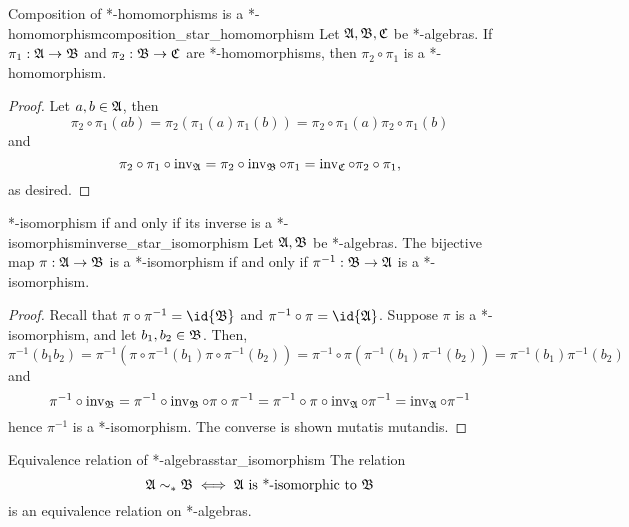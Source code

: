 \begin{lemma}{Composition of *-homomorphisms is a *-homomorphism}{composition_star_homomorphism}
    Let \(\mathfrak{A}, \mathfrak{B}, \mathfrak{C}\) be *-algebras. If \(\pi_1 : \mathfrak{A} \to \mathfrak{B}\) and \(\pi_2 : \mathfrak{B} \to \mathfrak{C}\) are *-homomorphisms, then \(\pi_2 \circ \pi_1\) is a *-homomorphism.
\end{lemma}
\begin{proof}
    Let \(a, b \in \mathfrak{A}\), then
    \begin{equation*}
        \pi_2\circ \pi_1(ab) = \pi_2(\pi_1(a) \pi_1(b)) = \pi_2\circ \pi_1(a) \pi_2\circ\pi_1(b)
    \end{equation*}
    and
    \begin{equation*}
        \pi_2\circ \pi_1 \circ \operatorname{inv}_{\mathfrak{A}} = \pi_2 \circ \operatorname{inv}_{\mathfrak{B}} \circ \pi_1 = \operatorname{inv}_{\mathfrak{C}} \circ \pi_2 \circ \pi_1,
    \end{equation*}
    as desired.
\end{proof}
\begin{lemma}{*-isomorphism if and only if its inverse is a *-isomorphism}{inverse_star_isomorphism}
    Let \(\mathfrak{A}, \mathfrak{B}\) be *-algebras. The bijective map \(\pi : \mathfrak{A} \to \mathfrak{B}\) is a *-isomorphism if and only if \(\pi^{-1} : \mathfrak{B} \to \mathfrak{A}\) is a *-isomorphism.
\end{lemma}
\begin{proof}
    Recall that \(\pi \circ \pi^{-1} = \id{\algebra{B}}\) and \(\pi^{-1} \circ \pi = \id{\algebra{A}}\). Suppose \(\pi\) is a *-isomorphism, and let \(b_1, b_2 \in \mathfrak{B}\). Then,
    \begin{equation*}
        \pi^{-1} (b_1b_2) = \pi^{-1} \left(\pi\circ \pi^{-1}(b_1)\pi\circ \pi^{-1}(b_2)\right) = \pi^{-1} \circ \pi \left(\pi^{-1}(b_1)\pi^{-1}(b_2)\right) = \pi^{-1}(b_1) \pi^{-1}(b_2)
    \end{equation*}
    and
    \begin{equation*}
        \pi^{-1} \circ \operatorname{inv}_{\mathfrak{B}} = \pi^{-1} \circ \operatorname{inv}_{\mathfrak{B}} \circ \pi \circ \pi^{-1} = \pi^{-1} \circ \pi \circ \operatorname{inv}_{\mathfrak{A}} \circ \pi^{-1} = \operatorname{inv}_{\mathfrak{A}}\circ \pi^{-1}
    \end{equation*}
    hence \(\pi^{-1}\) is a *-isomorphism. The converse is shown mutatis mutandis.
\end{proof}
\begin{proposition}{Equivalence relation of *-algebras}{star_isomorphism}
    The relation
    \begin{equation*}
        \mathfrak{A} \sim_* \mathfrak{B} \iff \mathfrak{A}\text{ is *-isomorphic to }\mathfrak{B}
    \end{equation*}
    is an equivalence relation on *-algebras.
\end{proposition}
